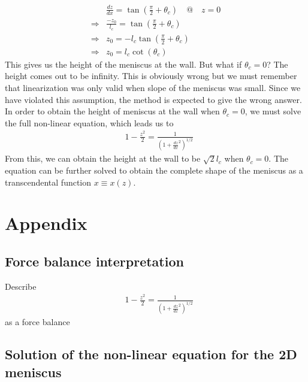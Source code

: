 \documentclass[11pt,a4paper]{article}
\newcommand{\1}{\vect{1}}
\begin{document}
\begin{align*}
&\frac{dz}{dx} = \tan(\frac{\pi}{2} + \theta_c) \quad @ \quad z=0\\
\Rightarrow &\frac{-z_0}{l_c} = \tan(\frac{\pi}{2} + \theta_c) \\
\Rightarrow & z_0 =-l_c \tan(\frac{\pi}{2} + \theta_c) \\
\Rightarrow & z_0 =l_c \cot(\theta_c) 
\end{align*}
This gives us the height of the meniscus at the wall. But what if $\theta_c = 0$? The height comes out to be infinity. This is obviously wrong but we must remember that linearization was only valid when slope of the meniscus was small. Since we have violated this assumption, the method is expected to give the wrong answer. In order to obtain the height of meniscus at the wall when $\theta_c = 0$, we must solve the full non-linear equation, which leads us to
\begin{align*}
&1-\frac{z^2}{2} = \frac{1}{(1+\frac{dz}{dx}^2)^{1/2}}
\end{align*}
From this, we can obtain the height at the wall to be $\sqrt 2 l_c$ when $\theta_c = 0$.
The equation can be further solved to obtain the complete shape of the meniscus as a transcendental function $x\equiv x(z)$.

\section{Appendix}
\subsection{Force balance interpretation}
Describe 
\begin{align*}
&1-\frac{z^2}{2} = \frac{1}{(1+\frac{dz}{dx}^2)^{1/2}}
\end{align*}
as a force balance

\subsection{Solution of the non-linear equation for the 2D meniscus}
\end{document}
